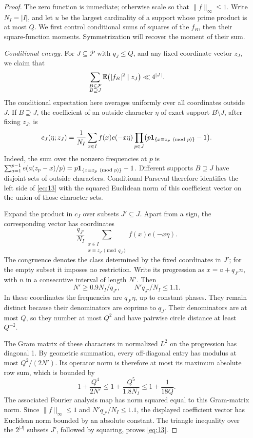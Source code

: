 \begin{proof}
The zero function is immediate; otherwise scale so that
\(\|f\|_\infty\le1\).  Write \(N_I=|I|\), and let \(u\) be the
largest cardinality of a support whose prime product is at most \(Q\).
We first control conditional sums of squares of the \(f_B\), then their
square-function moments.  Symmetrization will recover the moment of
their sum.

\smallskip
\noindent\emph{Conditional energy.}
For \(J\subseteq\mathcal P\) with \(q_J\le Q\), and any fixed
coordinate vector \(z_J\), we claim that
\begin{equation}
 \sum_{\substack{B\in\mathcal F\\B\supseteq J}}
       \mathbb E\bigl(|f_B|^2\mid z_J\bigr)\ll4^{|J|}.
 \label{eq:13}
\end{equation}
The conditional expectation here averages uniformly over all coordinates
outside \(J\).  If \(B\supseteq J\), the coefficient of an outside
character \(\eta\) of exact support \(B\setminus J\), after fixing
\(z_J\), is
\[
 c_J(\eta;z_J)
 =\frac1{N_I}\sum_{x\in I}f(x)e(-x\eta)
       \prod_{p\in J}\bigl(p\mathbf 1_{\{x\equiv z_p\pmod p\}}-1\bigr).
\]
Indeed, the sum over the nonzero frequencies at \(p\) is
\(\sum_{a=1}^{p-1}e(a(z_p-x)/p)
=p\mathbf 1_{\{x\equiv z_p\pmod p\}}-1\).
Different supports \(B\supseteq J\) have disjoint sets of outside
characters.  Conditional Parseval therefore identifies the left side of
\eqref{eq:13} with the squared Euclidean norm of this coefficient vector
on the union of those character sets.

Expand the product in \(c_J\) over subsets \(J'\subseteq J\).
Apart from a sign, the corresponding vector has coordinates
\[
 \frac{q_{J'}}{N_I}
 \sum_{\substack{x\in I\\x\equiv z_{J'}\pmod{q_{J'}}}}
                   f(x)e(-x\eta).
\]
The congruence denotes the class determined by the fixed coordinates in
\(J'\); for the empty subset it imposes no restriction.  Write its
progression as \(x=a+q_{J'}n\), with \(n\) in a consecutive interval
of length \(N'\).  Then
\[
 N'\ge0.9N_I/q_{J'},
 \qquad N'q_{J'}/N_I\le1.1.
\]
In these coordinates the frequencies are \(q_{J'}\eta\), up to
constant phases.  They remain distinct because their denominators are
coprime to \(q_J\).  Their denominators are at most \(Q\), so they
number at most \(Q^2\) and have pairwise circle distance at least
\(Q^{-2}\).

The Gram matrix of these characters in normalized \(L^2\) on the
progression has diagonal 1.  By geometric summation, every off-diagonal
entry has modulus at most \(Q^2/(2N')\).  Its operator norm is
therefore at most its maximum absolute row sum, which is bounded by
\[
 1+\frac{Q^4}{2N'}
 \le1+\frac{Q^5}{1.8N_I}
 \le1+\frac1{18Q}.
\]
The associated Fourier analysis map has norm squared equal to this
Gram-matrix norm.  Since \(\|f\|_\infty\le1\) and
\(N'q_{J'}/N_I\le1.1\), the displayed coefficient vector has
Euclidean norm bounded by an absolute constant.  The triangle inequality
over the \(2^{|J|}\) subsets \(J'\), followed by squaring, proves
\eqref{eq:13}.


\end{proof}
